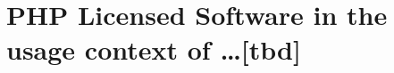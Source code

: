 %
%
%
%
%



\section{PHP Licensed Software in the usage context of \ldots [tbd]}
\label{OSUC-01-PHP} \label{OSUC-03-PHP} 
\label{OSUC-06-PHP} \label{OSUC-09-PHP}

\label{OSUC-02-PHP} \label{OSUC-04-PHP} \label{OSUC-05-PHP}
\label{OSUC-07-PHP} \label{OSUC-08-PHP} \label{OSUC-10-PHP}


%
